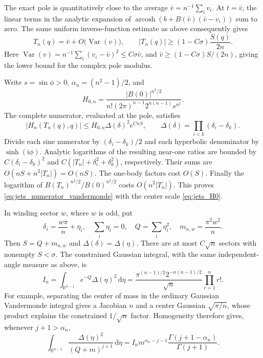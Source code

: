 \documentclass[11pt]{article}
\numberwithin{equation}{section}
\theoremstyle{definition}
\newcommand{\R}{\mathbb R}
\newcommand{\dd}{\,\mathrm d}
\newcommand{\ii}{\mathrm i}
\begin{document}
The exact pole is quantitatively close to the average
$\bar v=n^{-1}\sum_i v_i$. At $t=\bar v$, the linear terms in the
analytic expansion of
$\operatorname{arcosh}(b+B(\bar v)(\bar v-v_i))$ sum to zero.
The same uniform inverse-function estimate as above consequently gives
\begin{equation}\label{eq:jets_pole_lower}
 T_n(q)=\bar v+O\bigl(\operatorname{Var}(v)\bigr),\qquad
 |T_n(q)|\ge (1-C\sigma)\frac{S(q)}{2n}.
\end{equation}
Here $\operatorname{Var}(v)=n^{-1}\sum_i(v_i-\bar v)^2\le
C\sigma\bar v$, and
$\bar v\ge (1-C\sigma)S/(2n)$, giving the lower bound for
the complex pole modulus.

Write $s=\sin\phi>0$, $\alpha_n=(n^2-1)/2$, and
\begin{equation}\label{eq:jets_H0}
 H_{0,n}=\frac{|B(0)|^{n^2/2}}
 {n!(2\pi)^{n-1}2^{n(n-1)}s^{n^2}}.
\end{equation}
The complete numerator, evaluated at the pole, satisfies
\begin{equation}\label{eq:jets_numerator_vandermonde}
 |H_n(T_n(q),q)|\le H_{0,n}\Delta(\delta)^2 e^{CnS},
 \qquad \Delta(\delta)=\prod_{i<k}(\delta_i-\delta_k).
\end{equation}
Divide each sine numerator by $(\delta_i-\delta_k)/2$ and each
hyperbolic denominator by $\sinh(\ii\phi)$. Analytic logarithms of the
resulting near-one ratios are bounded by
$C(\delta_i-\delta_k)^2$ and
$C(|T_n|+\delta_i^2+\delta_k^2)$, respectively. Their sums are
$O(nS+n^2|T_n|)=O(nS)$. The one-body factors cost $O(S)$.
Finally the logarithm of
$B(T_n)^{n^2/2}/B(0)^{n^2/2}$ costs $O(n^2|T_n|)$.
This proves \eqref{eq:jets_numerator_vandermonde} with the center
scale \eqref{eq:jets_H0}.

In winding sector $w$, where $w$ is odd, put
\[
 \delta_i=\frac{w\pi}{n}+\eta_i,\quad
 \sum_i\eta_i=0,\quad Q=\sum_i\eta_i^2,\quad
 m_{n,w}=\frac{\pi^2w^2}{n}.
\]
Then $S=Q+m_{n,w}$ and $\Delta(\delta)=\Delta(\eta)$.
There are at most $C\sqrt n$ sectors with nonempty $S<\sigma$.
The constrained Gaussian integral, with the same independent-angle
measure as above, is
\begin{equation}\label{eq:jets_Mehta}
 I_n=\int_{\R^{n-1}}e^{-Q}\Delta(\eta)^2\dd\eta
 =\frac{\pi^{(n-1)/2}2^{-n(n-1)/2}}{\sqrt n}
   \prod_{r=1}^n r!.
\end{equation}
For example, separating the center of mass in the ordinary Gaussian
Vandermonde integral gives a Jacobian $n$ and a center Gaussian
$\sqrt{\pi/n}$, whose product explains the constrained
$1/\sqrt n$ factor. Homogeneity therefore gives, whenever
$j+1>\alpha_n$,
\begin{equation}\label{eq:jets_beta_integral}
 \int_{\R^{n-1}}\frac{\Delta(\eta)^2}{(Q+m)^{j+1}}\dd\eta
 =I_n m^{\alpha_n-j-1}
       \frac{\Gamma(j+1-\alpha_n)}{\Gamma(j+1)}.
\end{equation}
\end{document}
